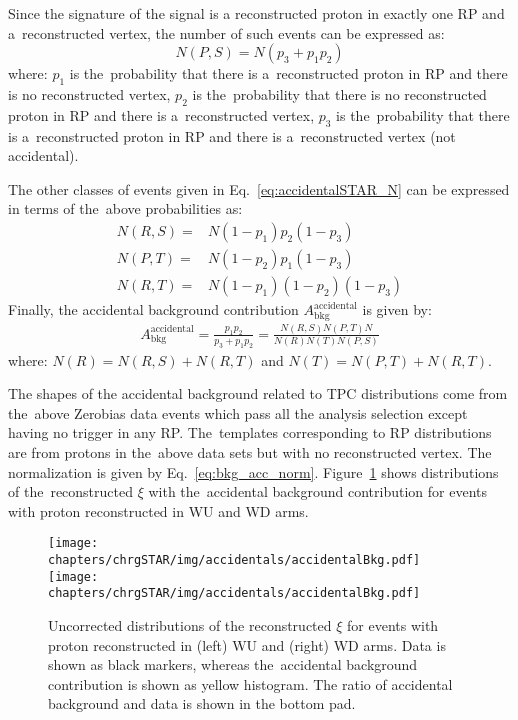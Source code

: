 Since the signature of the signal is a reconstructed proton in exactly one RP and a~reconstructed vertex, the number of such events can be expressed as:
\begin{equation}
N(P,S)=N\left(p_3+p_1p_2\right)
\end{equation}
where: $p_1$ is the~probability that there is a~reconstructed proton in RP and there is no reconstructed vertex, $p_2$ is the~probability that there is no reconstructed proton in RP and  there is a~reconstructed vertex, $p_3$ is the~probability that there is a~reconstructed proton in RP and  there is a~reconstructed vertex (not accidental).

The other classes of events given in Eq.~\eqref{eq:accidentalSTAR_N} can be expressed in terms of the~above probabilities as:
\begin{equation}
\begin{split}
N(R,S)=  & N(1-p_1)p_2(1-p_3)\\
N(P,T) = & N(1-p_2)p_1(1-p_3)\\
N(R,T) = & N(1-p_1)(1-p_2)(1-p_3)
\end{split}
\end{equation}
Finally, the accidental background contribution $A_{\mathrm{bkg} }^{\mathrm{accidental}}$ is  given by:
\begin{equation}
\begin{split}
A_{\mathrm{bkg}}^{\mathrm{accidental}}=  \frac{p_1p_2}{p_3+p_1p_2}=\frac{N(R,S)N(P,T)N}{N(R)N(T)N(P,S)}
\end{split}
\label{eq:bkg_acc_norm}
\end{equation} 
where: $N(R)=N(R,S)+N(R,T)$ and $N(T)=N(P,T)+N(R,T)$.

The shapes of the accidental background related to TPC distributions come from the~above Zerobias data events which pass all the analysis selection except having no trigger in any RP. The~templates corresponding to RP distributions are from protons in the~above data sets but with no reconstructed vertex. The normalization is given by Eq.~\eqref{eq:bkg_acc_norm}. Figure~\ref{fig:STARaccidentalsXi} shows distributions of the~reconstructed $\xi$ with the~accidental background contribution  for events with proton reconstructed in WU and WD arms. 

\begin{figure}[h!]
	\centering
	\texttt{[image: chapters/chrgSTAR/img/accidentals/accidentalBkg.pdf]}
	\texttt{[image: chapters/chrgSTAR/img/accidentals/accidentalBkg.pdf]}
	\caption{Uncorrected distributions of the reconstructed $\xi$ for events with proton reconstructed in (left) WU and (right) WD arms. Data is shown as black markers, whereas the~accidental background contribution is shown as yellow histogram.  The ratio of accidental background and data is shown in the bottom pad.}
	\label{fig:STARaccidentalsXi}
\end{figure}

